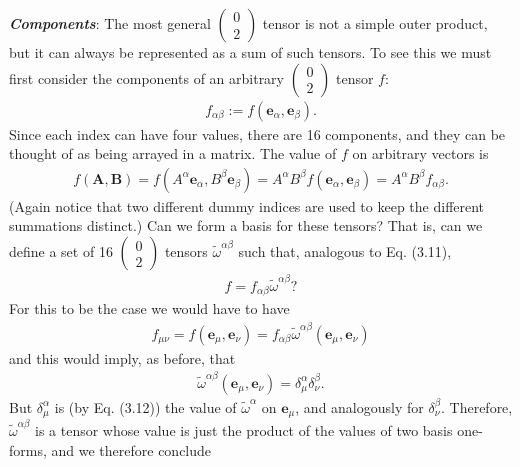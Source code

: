 \documentclass[12pt]{book}
\begin{document}
    \textit{\textbf{Components}}: The most general \(\left(\begin{array}{c} 0 \\ 2 \end{array}\right)\) tensor is not a simple outer product, but it can always be represented as a sum of such tensors. To see this we must first consider the components of an arbitrary \(\left(\begin{array}{c} 0 \\ 2 \end{array}\right)\) tensor \(f\):
    \begin{align}
    f_{\alpha\beta} := f(\mathbf{e}_\alpha, \mathbf{e}_\beta). \tag{3.21}
    \end{align}
    Since each index can have four values, there are 16 components, and they can be thought of as being arrayed in a matrix. The value of \(f\) on arbitrary vectors is
    \begin{align}
    f(\mathbf{A},\mathbf{B}) = f(A^\alpha \mathbf{e}_\alpha, B^\beta \mathbf{e}_\beta)
    = A^\alpha B^\beta f(\mathbf{e}_\alpha, \mathbf{e}_\beta)
    = A^\alpha B^\beta f_{\alpha\beta}. \tag{3.22}
    \end{align}
    (Again notice that two different dummy indices are used to keep the different summations distinct.) Can we form a basis for these tensors? That is, can we define a set of 16 \(\left(\begin{array}{c} 0 \\ 2 \end{array}\right)\) tensors \(\tilde{\omega}^{\alpha\beta}\) such that, analogous to Eq. (3.11),
    \begin{align}
    f = f_{\alpha\beta} \tilde{\omega}^{\alpha\beta}? \tag{3.23}
    \end{align}
    For this to be the case we would have to have
    \begin{align}
    f_{\mu\nu} = f(\mathbf{e}_\mu, \mathbf{e}_\nu) = f_{\alpha\beta} \tilde{\omega}^{\alpha\beta}(\mathbf{e}_\mu, \mathbf{e}_\nu)
    \end{align}
    and this would imply, as before, that
    \begin{align}
    \tilde{\omega}^{\alpha\beta}(\mathbf{e}_\mu, \mathbf{e}_\nu) = \delta^\alpha_\mu \delta^\beta_\nu. \tag{3.24}
    \end{align}
    But \(\delta^\alpha_\mu\) is (by Eq. (3.12)) the value of \(\tilde{\omega}^\alpha\) on \(\mathbf{e}_\mu\), and analogously for \(\delta^\beta_\nu\). Therefore, \(\tilde{\omega}^{\alpha\beta}\) is a tensor whose value is just the product of the values of two basis one-forms, and we therefore conclude
\end{document}
